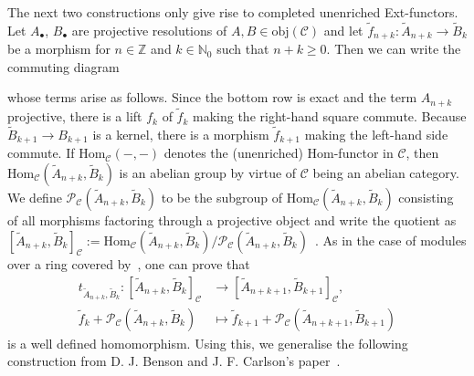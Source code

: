 \documentclass[12pt,a4paper]{article}
\numberwithin{equation}{section}
\theoremstyle{nonumberplain}
\begin{document}
The next two constructions only give rise to completed unenriched Ext-functors. Let $A_{\bullet}$, $B_{\bullet}$ are projective resolutions of $A, B \in \mathrm{obj}(\mathcal{C})$ and let $\widetilde{f}_{n+k}: \widetilde{A}_{n+k} \rightarrow \widetilde{B}_k$ be a morphism for $n \in \mathbb{Z}$ and $k \in \mathbb{N}_0$ such that $n+k \geq 0$. Then we can write the commuting diagram
\begin{center}
\end{center}
whose terms arise as follows. Since the bottom row is exact and the term $A_{n+k}$ projective, there is a lift $f_k$ of $\widetilde{f}_k$ making the right-hand square commute. Because $\widetilde{B}_{k+1} \rightarrow B_{k+1}$ is a kernel, there is a morphism $\widetilde{f}_{k+1}$ making the left-hand side commute. If $\mathrm{Hom}_{\mathcal{C}}(-, -)$ denotes the (unenriched) Hom-functor in $\mathcal{C}$, then $\mathrm{Hom}_{\mathcal{C}}(\widetilde{A}_{n+k}, \widetilde{B}_k)$ is an abelian group by virtue of $\mathcal{C}$ being an abelian category. We define $\mathcal{P}_{\mathcal{C}}(\widetilde{A}_{n+k}, \widetilde{B}_k)$ to be the subgroup of $\mathrm{Hom}_{\mathcal{C}}(\widetilde{A}_{n+k}, \widetilde{B}_k)$ consisting of all morphisms factoring through a projective object and write the quotient as $[\widetilde{A}_{n+k}, \widetilde{B}_k]_{\mathcal{C}} := \mathrm{Hom}_{\mathcal{C}}(\widetilde{A}_{n+k}, \widetilde{B}_k)/ \mathcal{P}_{\mathcal{C}}(\widetilde{A}_{n+k}, \widetilde{B}_k)$~\cite[p.~203]{kro95}. As in the case of modules over a ring covered by~\cite[p.~204]{kro95}, one can prove that
\begin{align*}
t_{\widetilde{A}_{n+k}, \widetilde{B}_k}: [\widetilde{A}_{n+k}, \widetilde{B}_k]_{\mathcal{C}} &\rightarrow [\widetilde{A}_{n+k+1}, \widetilde{B}_{k+1}]_{\mathcal{C}}, \\
\widetilde{f}_k + \mathcal{P}_{\mathcal{C}}(\widetilde{A}_{n+k}, \widetilde{B}_k) &\mapsto \widetilde{f}_{k+1} + \mathcal{P}_{\mathcal{C}}(\widetilde{A}_{n+k+1}, \widetilde{B}_{k+1})
\end{align*}
is a well defined homomorphism. Using this, we generalise the following construction from D.\! J.\! Benson and J.\! F.\! Carlson's paper~\cite[p.~109]{ben92}.
\end{document}
